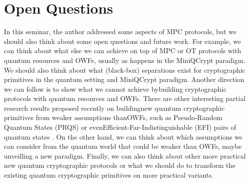 \documentclass[12pt]{article}
\begin{document}
    
    \section{Open Questions}
    \label{sec:open-questions}

    In this seminar, the author addressed some aspects of MPC protocols, but we should also think about some open questions and future work. For example, we can think about what else we can achieve on top of MPC or OT protocols with quantum resources and OWFs, usually as happens in the MiniQCrypt paradigm. We should also think about what (black-box) separations exist for cryptographic primitives in the quantum setting and MiniQCrypt paradigm. Another direction we can follow is to show what we cannot achieve by\break building cryptographic protocols with quantum resources and OWFs. There are other interesting partial research results proposed recently on building\break new quantum cryptographic primitives from weaker assumptions than\break OWFs, such as Pseudo-Random Quantum States (PRQS) \cite{ji-liu-song:pseudorandom-quantum-states:2018:03-2024,ananth-qian-yuen:cryptography-pseudorandom-quantum-states:2022-03-2024} or even\break Efficient-Far-Indistinguishable (EFI) pairs of quantum states \cite{yan:general-properties-quantum-bit-commitments:2020:03-2024,brakerski-canetti-qian:computational-hardness-needed-quantum-cryptography:2022:03-2024,morimae-yamakawa:one-wayness-quantum-cryptography:2022:03-2024}. On the other hand, we can think about which assumptions we can consider from the quantum world that could be weaker than OWFs, maybe unveilling a new paradigm. Finally, we can also think about other more practical new quantum cryptographic protocols or what we should do to transform the existing quantum cryptographic primitives on more practical variants.
    
    
    

    \clearpage
    
    
    \label{bib:bibliography}
    
\end{document}
